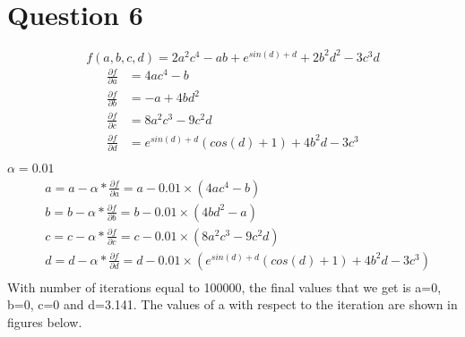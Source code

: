 \documentclass[letter, 10pt]{article}
\begin{document}
\section*{Question 6}
\begin{equation*}
    f(a,b,c,d) = 2a^2c^4 - ab + e^{sin(d)+d} + 2b^2d^2 - 3c^3d
\end{equation*}
\begin{align*}
    \frac{\partial f}{\partial a} &= 4ac^4 - b\\
    \frac{\partial f}{\partial b} &= - a + 4bd^2\\
    \frac{\partial f}{\partial c} &= 8a^2c^3 - 9c^2d\\
    \frac{\partial f}{\partial d} &= e^{sin(d)+d}(cos(d) + 1) + 4b^2d - 3c^3\\
\end{align*}
$\alpha = 0.01$
\begin{align*}
    & a = a - \alpha* \frac{\partial f}{\partial a} = a - 0.01\times(4ac^4 - b)\\
    & b = b - \alpha* \frac{\partial f}{\partial b} = b - 0.01\times(4bd^2 - a)\\
    & c = c - \alpha* \frac{\partial f}{\partial c} = c - 0.01\times(8a^2c^3 - 9c^2d)\\
    & d = d - \alpha* \frac{\partial f}{\partial d} = d - 0.01\times(e^{sin(d)+d}(cos(d) + 1) + 4b^2d - 3c^3)\\
\end{align*}
With number of iterations equal to 100000, the final values that we get is a=0, b=0, c=0 and d=3.141. The values of a with respect to the iteration are shown in figures below.
\newpage
\end{document}

